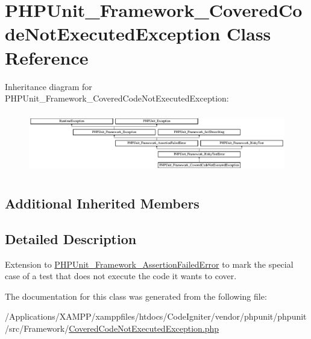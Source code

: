 \hypertarget{class_p_h_p_unit___framework___covered_code_not_executed_exception}{}\section{P\+H\+P\+Unit\+\_\+\+Framework\+\_\+\+Covered\+Code\+Not\+Executed\+Exception Class Reference}
\label{class_p_h_p_unit___framework___covered_code_not_executed_exception}
Inheritance diagram for P\+H\+P\+Unit\+\_\+\+Framework\+\_\+\+Covered\+Code\+Not\+Executed\+Exception\+:\begin{figure}[H]
\begin{center}
\leavevmode
\includegraphics[height=2.681992cm]{class_p_h_p_unit___framework___covered_code_not_executed_exception}
\end{center}
\end{figure}
\subsection*{Additional Inherited Members}


\subsection{Detailed Description}
Extension to \mbox{\hyperlink{class_p_h_p_unit___framework___assertion_failed_error}{P\+H\+P\+Unit\+\_\+\+Framework\+\_\+\+Assertion\+Failed\+Error}} to mark the special case of a test that does not execute the code it wants to cover. 

The documentation for this class was generated from the following file\+:\begin{DoxyCompactItemize}
\item 
/\+Applications/\+X\+A\+M\+P\+P/xamppfiles/htdocs/\+Code\+Igniter/vendor/phpunit/phpunit/src/\+Framework/\mbox{\hyperlink{phpunit_2src_2_framework_2_covered_code_not_executed_exception_8php}{Covered\+Code\+Not\+Executed\+Exception.\+php}}\end{DoxyCompactItemize}
